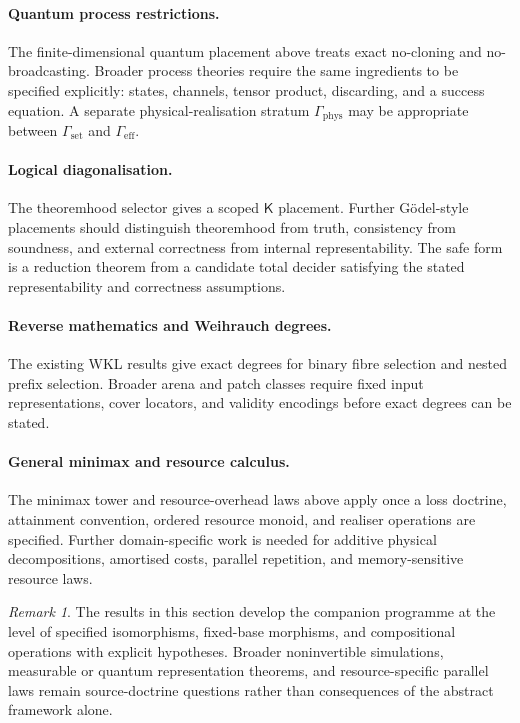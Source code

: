 \documentclass[11pt]{article}
\theoremstyle{plain}
\theoremstyle{definition}
\theoremstyle{remark}
\newtheorem{remark}[theorem]{Remark}
\begin{document}
\paragraph{Quantum process restrictions.}
The finite-dimensional quantum placement above treats exact no-cloning and
no-broadcasting. Broader process theories require the same ingredients to be
specified explicitly: states, channels, tensor product, discarding, and a success
equation. A separate physical-realisation stratum
$\Gamma_{\mathrm{phys}}$ may be appropriate between $\Gamma_{\mathrm{set}}$ and
$\Gamma_{\mathrm{eff}}$.

\paragraph{Logical diagonalisation.}
The theoremhood selector gives a scoped $\mathsf K$ placement. Further
Gödel-style placements should distinguish theoremhood from truth, consistency
from soundness, and external correctness from internal representability. The safe
form is a reduction theorem from a candidate total decider satisfying the stated
representability and correctness assumptions.

\paragraph{Reverse mathematics and Weihrauch degrees.}
The existing WKL results give exact degrees for binary fibre selection and nested
prefix selection. Broader arena and patch classes require fixed input
representations, cover locators, and validity encodings before exact degrees can
be stated.

\paragraph{General minimax and resource calculus.}
The minimax tower and resource-overhead laws above apply once a loss doctrine,
attainment convention, ordered resource monoid, and realiser operations are
specified. Further domain-specific work is needed for additive physical
decompositions, amortised costs, parallel repetition, and memory-sensitive
resource laws.

\begin{remark}
The results in this section develop the companion programme at the level of
specified isomorphisms, fixed-base morphisms, and compositional operations with
explicit hypotheses. Broader noninvertible simulations, measurable or quantum
representation theorems, and resource-specific parallel laws remain
source-doctrine questions rather than consequences of the abstract framework
alone.
\end{remark}
\end{document}

